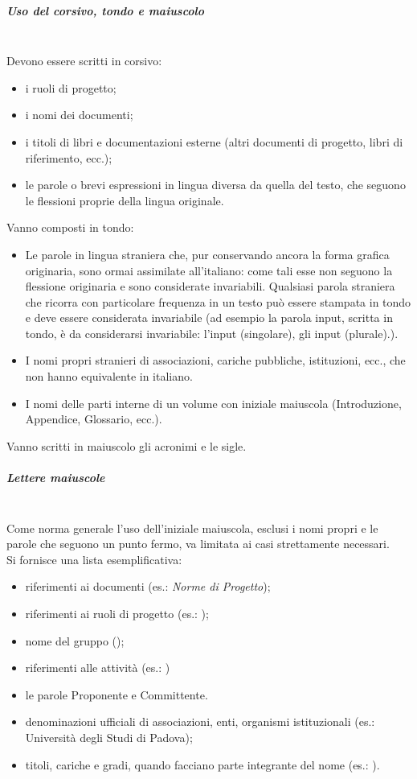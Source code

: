 \subparagraph{Uso del corsivo, tondo e maiuscolo} \label{sec:corsivo_tondo_maiuscolo} \mbox{} \\
Devono essere scritti in corsivo:
\begin{itemize}
	\item i ruoli di progetto;
	\item i nomi dei documenti;
	\item i titoli di libri e documentazioni esterne (altri documenti di progetto, libri di riferimento, ecc.);
	\item le parole o brevi espressioni in lingua diversa da quella del testo, che seguono le flessioni proprie della lingua originale.
\end{itemize}
Vanno composti in tondo:
\begin{itemize}
	\item Le parole in lingua straniera che, pur conservando ancora la forma grafica originaria, sono ormai assimilate all'italiano: come tali esse non seguono la flessione originaria e sono considerate invariabili. Qualsiasi parola straniera che ricorra con particolare frequenza in un testo può essere stampata in tondo e deve essere considerata invariabile (ad esempio la parola input, scritta in tondo, è da considerarsi invariabile: l'input (singolare), gli input (plurale).).
	\item I nomi propri stranieri di associazioni, cariche pubbliche, istituzioni, ecc., che non hanno equivalente in italiano.
	\item I nomi delle parti interne di un volume con iniziale maiuscola (Introduzione, Appendice, Glossario, ecc.).
\end{itemize}
Vanno scritti in maiuscolo gli acronimi e le sigle.

\subparagraph{Lettere maiuscole}\label{sec:lettere_maiuscole} \mbox{} \\
Come norma generale l'uso dell'iniziale maiuscola, esclusi i nomi propri e le parole che seguono un punto fermo, va limitata ai casi strettamente necessari.\\
Si fornisce una lista esemplificativa:
\begin{itemize}
	\item riferimenti ai documenti (es.: \textit{Norme di Progetto});
	\item riferimenti ai ruoli di progetto (es.: \Amministratore{});
	\item nome del gruppo (\GroupName);
	\item riferimenti alle attività (es.: \VV) 
	\item le parole Proponente e Committente.
	\item denominazioni ufficiali di associazioni, enti, organismi istituzionali (es.: Università degli Studi di Padova);
	\item titoli, cariche e gradi, quando facciano parte integrante del nome (es.: \CommittenteInline).
\end{itemize}

